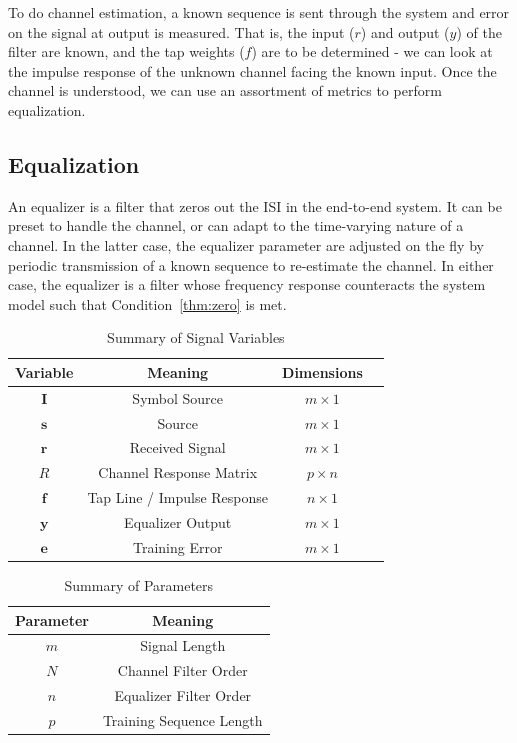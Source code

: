 \documentclass[]{article}
\begin{document}
To do channel estimation, a known sequence is sent through the system and error on the signal at output is measured.  That is, the input ($r$) and output ($y$) of the filter are known, and the tap weights ($f$) are to be determined - we can look at the impulse response of the unknown channel facing the known input.  Once the channel is understood, we can use an assortment of metrics to perform equalization.

\subsection{Equalization}
\label{sec:equal}
An equalizer is a filter that zeros out the ISI in the end-to-end system.  It can be preset to handle the channel, or can adapt to the time-varying nature of a channel.  In the latter case, the equalizer parameter are adjusted on the fly by periodic transmission of a known sequence to re-estimate the channel.  In either case, the equalizer is a filter whose frequency response counteracts the system model such that Condition~\ref{thm:zero} is met. 

\begin{table}[H]
\begin{center}
\begin{tabular}{|c|c|c|c|}
\hline Variable & Meaning & Dimensions \\
\hline \hline
$\mathbf{I}$ & Symbol Source & $ m \times 1$ \\ \hline
$\mathbf{s}$ & Source & $m\times 1 $\\ \hline
$\mathbf{r}$ & Received Signal & $m\times 1$ \\ \hline
$R$ & Channel Response Matrix & $p\times n$ \\ \hline
$\mathbf{f}$ & Tap Line / Impulse Response & $n\times 1 $ \\ \hline
$\mathbf{y}$ & Equalizer Output & $ m\times 1 $ \\ \hline
 $\mathbf{e}$ & Training Error & $ m\times 1 $ \\ \hline
\end{tabular}
\caption{Summary of Signal Variables} \label{tab:filtersummary}
\end{center}
\end{table}

\begin{table}[b]
\begin{center}
\begin{tabular}{|c|c|}
\hline Parameter & Meaning \\
\hline \hline
$m$ & Signal Length \\ \hline
$N$ & Channel Filter Order \\ \hline
$n$ & Equalizer Filter Order \\ \hline
$p$ & Training Sequence Length \\ \hline
\end{tabular}
\caption{Summary of Parameters} \label{tab:Paramsummary}
\end{center}
\end{table}
\end{document}
